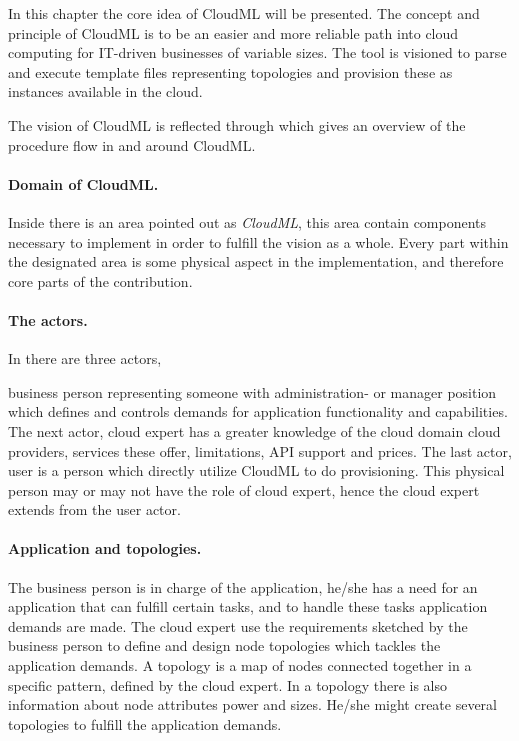 

In this chapter the core idea of CloudML will be presented.
The concept and principle of CloudML is to be an easier and more reliable
path into cloud computing for IT-driven businesses of variable sizes.
The tool is visioned to parse and execute template files representing topologies
and provision these as instances available in the cloud. 

The vision of CloudML is reflected through  which gives
an overview of the procedure flow in and around CloudML.

\paragraph{Domain of CloudML.}

Inside  there is an area pointed out as \emph{CloudML},
this area contain components necessary to implement in order to fulfill
the vision as a whole.
Every part within the designated area is some physical aspect in the 
implementation, and therefore core parts of the contribution.

\paragraph{The actors.}

In  there are three actors,
\begin{ii}
  \iitem business person representing someone with administration- or manager position which
    defines and controls demands for application functionality and capabilities.
    The next actor,
  \iitem cloud expert has a greater knowledge of the cloud domain 
    \eg cloud providers,
    services these offer, limitations, API support and prices.
    The last actor,
  \iitem user is a person which directly utilize CloudML to do provisioning.
    This physical person may or may not have the role of cloud expert, 
    hence the cloud expert extends from the user actor.
\end{ii}

\paragraph{Application and topologies.}

The business person is in charge of the application, he/she has a need
for an application that can fulfill certain tasks, and to handle these 
tasks application demands are made.
The cloud expert use the requirements sketched by the business person to 
define and design node topologies which tackles the application demands.
A topology is a map of nodes connected together in a specific pattern, 
defined by the cloud expert.
In a topology there is also information about node attributes 
\eg {} power and  sizes.
He/she might create several topologies to fulfill the application demands.


